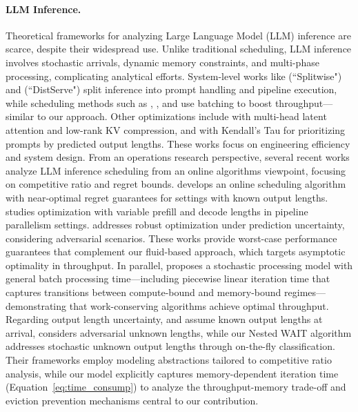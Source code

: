 \paragraph*{LLM Inference.} 
Theoretical frameworks for analyzing Large Language Model (LLM) inference are scarce, despite their widespread use. Unlike traditional scheduling, LLM inference involves stochastic arrivals, dynamic memory constraints, and multi-phase processing, complicating analytical efforts. System-level works like \cite{patel2023peeling} (``Splitwise") and \cite{zhong2024distserve} (``DistServe") split inference into prompt handling and pipeline execution, while scheduling methods such as \cite{yu2022orca}, \cite{agrawal2023sarathi}, and \cite{agrawal2024taming} use batching to boost throughput—similar to our approach. Other optimizations include \cite{deepseekai2024deepseekv2strongeconomicalefficient} with multi-head latent attention and low-rank KV compression, and \cite{fu2025efficient} with Kendall's Tau for prioritizing prompts by predicted output lengths. These works focus on engineering efficiency and system design. 
From an operations research perspective, several recent works analyze LLM inference scheduling from an online algorithms viewpoint, focusing on competitive ratio and regret bounds. \cite{jaillet2025onlineschedulingllminference} develops an online scheduling algorithm with near-optimal regret guarantees for settings with known output lengths. \cite{wang2025llm} studies optimization with variable prefill and decode lengths in pipeline parallelism settings. \cite{chen2025adaptively} addresses robust optimization under prediction uncertainty, considering adversarial scenarios. These works provide worst-case performance guarantees that complement our fluid-based approach, which targets asymptotic optimality in throughput. In parallel, \cite{li2025throughput} proposes a stochastic processing model with general batch processing time—including piecewise linear iteration time that captures transitions between compute-bound and memory-bound regimes—demonstrating that work-conserving algorithms achieve optimal throughput. Regarding output length uncertainty, \cite{jaillet2025onlineschedulingllminference} and \cite{wang2025llm} assume known output lengths at arrival, \cite{chen2025adaptively} considers adversarial unknown lengths, while our Nested WAIT algorithm addresses stochastic unknown output lengths through on-the-fly classification. Their frameworks employ modeling abstractions tailored to competitive ratio analysis, while our model explicitly captures memory-dependent iteration time (Equation~\eqref{eq:time_consump}) to analyze the throughput-memory trade-off and eviction prevention mechanisms central to our contribution.


